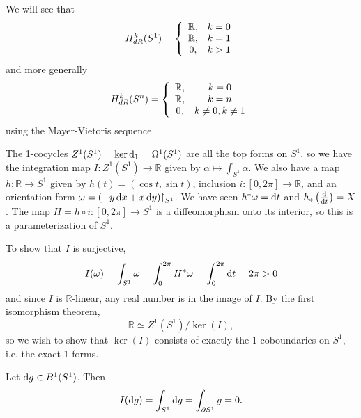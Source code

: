 \begin{xmpl}[Cohomology of $S^1$]
We will see that
$$
  H_{dR}^k(S^1)
= \left\{
    \begin{array}{c c}
      \mathbb{R}, & k = 0 \\
      \mathbb{R}, & k = 1 \\
      0,          & k > 1 \\
    \end{array}
  \right.
$$
and more generally
$$
  H_{dR}^k(S^n)
= \left\{
    \begin{array}{c c}
      \mathbb{R}, & k = 0 \\
      \mathbb{R}, & k = n \\
      0,          & k \neq 0, k \neq 1 \\
    \end{array}
  \right.
$$
using the Mayer-Vietoris sequence.

The 1-cocycles
$Z^1(S^1) = \ker \mathop{}\!\mathrm{d}_1 = \Omega^1(S^1)$ are all the top forms on
$S^1$, so we have the integration map
$I: Z^1(S^1) \to \mathbb{R}$ given by
$\alpha \mapsto \int_{S^1} \alpha$. We also have a map
$h : \mathbb{R} \to S^1$ given by $h(t) = (\cos t, \sin t)$,
inclusion $i: [0, 2\pi] \to \mathbb{R}$, and an orientation form
$\omega = (-y \mathop{}\!\mathrm{d} x + x \mathop{}\!\mathrm{d} y)\mathord{\upharpoonright}_{S^1}$. We have seen
$h^\ast \omega = \mathop{}\!\mathrm{d} t$ and $h_\ast\left(\frac{\mathop{}\!\mathrm{d}}{\mathop{}\!\mathrm{d} t}\right) =
X$. The map $H = h \circ i : [0, 2\pi] \to S^1$ is a diffeomorphism
onto its interior, so this is a parameterization of $S^1$.

To show that $I$ is surjective,
$$
  I(\omega)
= \int_{S^1} \omega
= \int_0^{2\pi} H^\ast \omega
= \int_0^{2\pi} \mathop{}\!\mathrm{d} t
= 2 \pi > 0
$$
and since $I$ is $\mathbb{R}$-linear, any real number is in the image
of $I$. By the first isomorphism theorem,
$$
\mathbb{R} \simeq Z^1(S^1) / \ker(I),
$$
so we wish to show that $\ker(I)$ consists of exactly the
1-coboundaries on $S^1$, i.e. the exact 1-forms.

Let $\mathop{}\!\mathrm{d} g \in B^1(S^1)$. Then
$$
I(\mathop{}\!\mathrm{d} g) = \int_{S^1} \mathop{}\!\mathrm{d} g = \int_{\partial S^1} g = 0.
$$


\end{xmpl}
